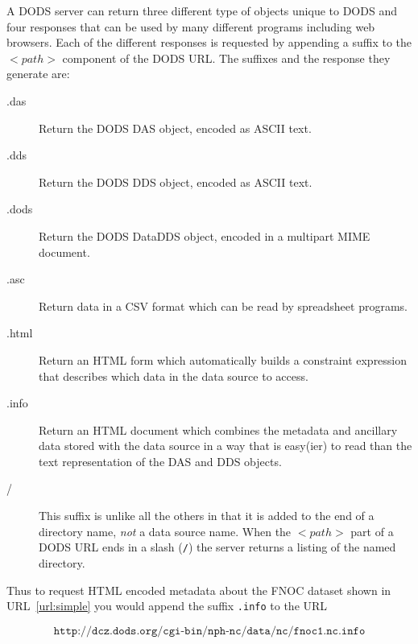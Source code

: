 \documentclass{article}
\begin{document}
A DODS server can return three different type of objects unique to DODS and
four responses that can be used by many different programs including web
browsers. Each of the different responses is requested by appending a suffix
to the $<path>$ component of the DODS URL. The suffixes and the response they
generate are:
\begin{description}
\item[.das] Return the DODS DAS object, encoded as ASCII text.
\item[.dds] Return the DODS DDS object, encoded as ASCII text.
\item[.dods] Return the DODS DataDDS object, encoded in a multipart MIME
  document. 
\item[.asc] Return data in a CSV format which can be read by spreadsheet
  programs.
\item[.html] Return an HTML form which automatically builds a constraint
  expression that describes which data in the data source to access.
\item[.info] Return an HTML document which combines the metadata and
  ancillary data stored with the data source in a way that is easy(ier) to
  read than the text representation of the DAS and DDS objects.
\item[/] This suffix is unlike all the others in that it is added to the
  end of a directory name, \emph{not} a data source name. When the $<path>$
  part of a DODS URL ends in a slash (\texttt{/}) the server returns a
  listing of the named directory.
\end{description}
Thus to request HTML encoded metadata about the FNOC dataset shown in
URL~\ref{url:simple} you would append the suffix \texttt{.info} to the URL

\begin{equation}
\texttt{http://dcz.dods.org/cgi-bin/nph-nc/data/nc/fnoc1.nc.info}
\label{url:info}
\end{equation}
\end{document}
